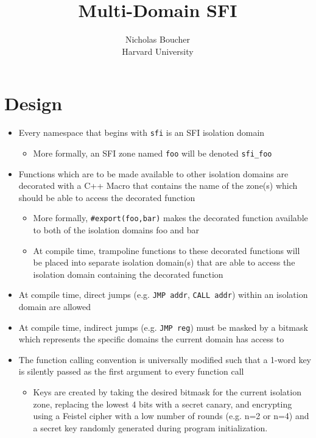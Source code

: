 \documentclass[12pt]{article}
\begin{document}
 
\title{Multi-Domain SFI}
\author{Nicholas Boucher \\ Harvard University}

\maketitle

\section{Design}

\begin{itemize}
	\item Every namespace that begins with \texttt{sfi} is an SFI isolation domain
	\begin{itemize}
		\item More formally, an SFI zone named \texttt{foo} will be denoted \texttt{sfi\_foo}
	\end{itemize}
	\item Functions which are to be made available to other isolation domains are decorated with a C++ Macro that contains the name of the zone(s) which should be able to access the decorated function
	\begin{itemize}
		\item More formally, \texttt{\#export(foo,bar)} makes the decorated function available to both of the isolation domains foo and bar
		\item At compile time, trampoline functions to these decorated functions will be placed into separate isolation domain(s) that are able to access the isolation domain containing the decorated function
	\end{itemize}
	\item At compile time, direct jumps (e.g. \texttt{JMP addr}, \texttt{CALL addr}) within an isolation domain are allowed
	\item At compile time, indirect jumps (e.g. \texttt{JMP reg}) must be masked by a bitmask which represents the specific domains the current domain has access to
	\item The function calling convention is universally modified such that a 1-word key is silently passed as the first argument to every function call
	\begin{itemize}
		\item Keys are created by taking the desired bitmask for the current isolation zone, replacing the lowest 4 bits with a secret canary, and encrypting using a Feistel cipher with a low number of rounds (e.g. n=2 or n=4) and a secret key randomly generated during program initialization.

\end{itemize}
\end{itemize}
\end{document}
